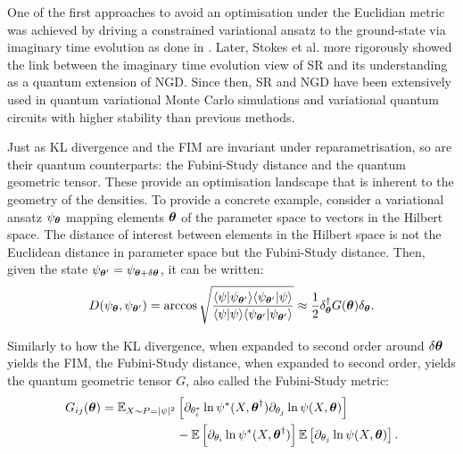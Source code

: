 One of the first approaches to avoid an optimisation under the Euclidian metric was achieved by driving a constrained variational ansatz to the ground-state via imaginary time evolution as done in \cite{mcardle2019variational}. Later, Stokes et al. \cite{stokes2020quantum} more rigorously showed the link between the imaginary time evolution view of SR and its understanding as a quantum extension of NGD. Since then, SR and NGD have been extensively used in quantum variational Monte Carlo simulations and variational quantum circuits \cite{park2020geometry, ferminet, drissifermion} with higher stability than previous methods.

Just as KL divergence and the FIM are invariant under reparametrisation, so are their quantum counterparts: the Fubini-Study distance \cite{stokes2020quantum} and the quantum geometric tensor. These provide an optimisation landscape that is inherent to the geometry of the densities. To provide a concrete example, consider a variational ansatz $\psi_{\boldsymbol{\theta}}$ mapping elements $\boldsymbol{\theta}$ of the parameter space to vectors in the Hilbert space. The distance of interest between elements in the Hilbert space is not the Euclidean distance in parameter space but the Fubini-Study distance. Then, given the state $\psi_{\boldsymbol{\theta}' } =\psi_{\boldsymbol{\theta} + \delta\boldsymbol{\theta} }$, it can be written:
\begin{equation}
D(\psi_{\boldsymbol{\theta}}, \psi_{\boldsymbol{\theta}' }) = \arccos \sqrt{\frac{\langle\psi|\psi_{\boldsymbol{\theta}'}\rangle \langle\psi_{\boldsymbol{\theta}'}|\psi\rangle}{\langle\psi|\psi\rangle \langle\psi_{\boldsymbol{\theta}'}|\psi_{\boldsymbol{\theta}'}\rangle}} \approx \frac{1}{2}\delta_{\boldsymbol{\theta}}^\dagger G(\boldsymbol{\theta}) \delta_{\boldsymbol{\theta}}.
\end{equation}

Similarly to how the KL divergence, when expanded to second order around $\delta \boldsymbol{\theta}$ yields the FIM, the Fubini-Study distance, when expanded to second order, yields the quantum geometric tensor $G$, also called the Fubini-Study metric:
\begin{align}
G_{ij}(\boldsymbol{\theta})= \mathbb{E}_{X \sim P=|\psi|^2} &\left[ \partial_{\theta_i^*} \ln \psi^*(X, \boldsymbol{\theta}^\dagger) \partial_{\theta_j} \ln \psi(X, \boldsymbol{\theta}) \right] \\  
&- \mathbb{E} \left[ \partial_{\theta_i} \ln \psi^*(X, \boldsymbol{\theta}^\dagger) \right] \mathbb{E} \left[ \partial_{\theta_j} \ln \psi(X, \boldsymbol{\theta}) \right].
\end{align}

